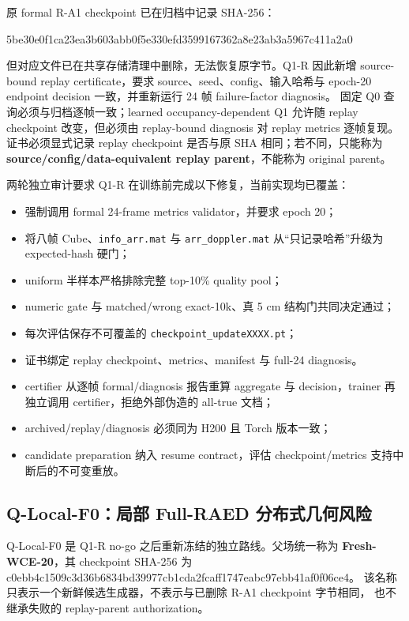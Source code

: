 \documentclass[11pt,a4paper,fontset=none]{ctexart}
\newcommand{\code}[1]{\texttt{#1}}
\newcommand{\hash}[2]{{\small\ttfamily #1\allowbreak{}#2}}
\begin{document}
原 formal R-A1 checkpoint 已在归档中记录 SHA-256：
\begin{center}
  \small\ttfamily
  5be30e0f1ca23ea3b603abb0f5e330efd3599167362a8e23ab3a5967c411a2a0
\end{center}
但对应文件已在共享存储清理中删除，无法恢复原字节。Q1-R 因此新增
source-bound replay certificate，要求 source、seed、config、输入哈希与
epoch-20 endpoint decision 一致，并重新运行 24 帧 failure-factor diagnosis。
固定 Q0 查询必须与归档逐帧一致；learned occupancy-dependent Q1 允许随 replay
checkpoint 改变，但必须由 replay-bound diagnosis 对 replay metrics 逐帧复现。
证书必须显式记录 replay checkpoint 是否与原 SHA 相同；若不同，只能称为
\textbf{source/config/data-equivalent replay parent}，不能称为 original parent。

两轮独立审计要求 Q1-R 在训练前完成以下修复，当前实现均已覆盖：
\begin{itemize}
  \item 强制调用 formal 24-frame metrics validator，并要求 epoch 20；
  \item 将八帧 Cube、\code{info\_arr.mat} 与 \code{arr\_doppler.mat}
  从“只记录哈希”升级为 expected-hash 硬门；
  \item uniform 半样本严格排除完整 top-10\% quality pool；
  \item numeric gate 与 matched/wrong exact-10k、真 5 cm 结构门共同决定通过；
  \item 每次评估保存不可覆盖的 \code{checkpoint\_updateXXXX.pt}；
  \item 证书绑定 replay checkpoint、metrics、manifest 与 full-24 diagnosis。
  \item certifier 从逐帧 formal/diagnosis 报告重算 aggregate 与 decision，trainer
  再独立调用 certifier，拒绝外部伪造的 all-true 文档；
  \item archived/replay/diagnosis 必须同为 H200 且 Torch 版本一致；
  \item candidate preparation 纳入 resume contract，评估 checkpoint/metrics
  支持中断后的不可变重放。
\end{itemize}

\subsection{Q-Local-F0：局部 Full-RAED 分布式几何风险}

Q-Local-F0 是 Q1-R no-go 之后重新冻结的独立路线。父场统一称为
\textbf{Fresh-WCE-20}，其 checkpoint SHA-256 为
\hash{c0ebb4c1509c3d36b6834bd39977cb1c}{da2fcaff1747eabc97ebb41af0f06ce4}。
该名称只表示一个新鲜候选生成器，不表示与已删除 R-A1 checkpoint 字节相同，
也不继承失败的 replay-parent authorization。
\end{document}
